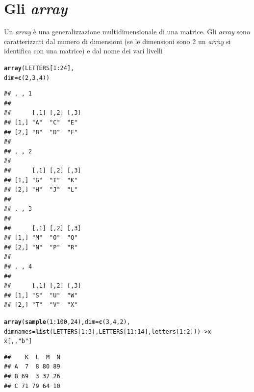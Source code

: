 \documentclass[onecolumn,12pt]{book}\usepackage[]{graphicx}\usepackage[]{color}
\makeatletter
\newcommand{\hlnum}[1]{\textcolor[rgb]{0.686,0.059,0.569}{#1}}%
\newcommand{\hlstr}[1]{\textcolor[rgb]{0.192,0.494,0.8}{#1}}%
\newcommand{\hlopt}[1]{\textcolor[rgb]{0,0,0}{#1}}%
\newcommand{\hlstd}[1]{\textcolor[rgb]{0.345,0.345,0.345}{#1}}%
\newcommand{\hlkwb}[1]{\textcolor[rgb]{0.69,0.353,0.396}{#1}}%
\newcommand{\hlkwc}[1]{\textcolor[rgb]{0.333,0.667,0.333}{#1}}%
\newcommand{\hlkwd}[1]{\textcolor[rgb]{0.737,0.353,0.396}{\textbf{#1}}}%
\newenvironment{kframe}{%
 \def\at@end@of@kframe{}%
 \ifinner\ifhmode%
  \def\at@end@of@kframe{\end{minipage}}%
  \begin{minipage}{\columnwidth}%
 \fi\fi%
 \def\FrameCommand##1{\hskip\@totalleftmargin \hskip-\fboxsep
 \colorbox{shadecolor}{##1}\hskip-\fboxsep
     \hskip-\linewidth \hskip-\@totalleftmargin \hskip\columnwidth}%
 \MakeFramed {\advance\hsize-\width
   \@totalleftmargin\z@ \linewidth\hsize
   \@setminipage}}%
 {\par\unskip\endMakeFramed%
 \at@end@of@kframe}
\newenvironment{knitrout}{}{} %
\makeatother
\begin{document}
\section{Gli \emph{array}}
Un \emph{array}  \`e una generalizzazione multidimensionale di una matrice. Gli \emph{array} sono caratterizzati dal numero di dimensioni  (se le dimensioni sono 2 un \emph{array} si identifica con una  matrice) e dal nome dei vari livelli
\begin{knitrout}
\color{fgcolor}\begin{kframe}
\begin{alltt}
\hlkwd{array}\hlstd{(LETTERS[}\hlnum{1}\hlopt{:}\hlnum{24}\hlstd{],}
\hlkwc{dim}\hlstd{=}\hlkwd{c}\hlstd{(}\hlnum{2}\hlstd{,}\hlnum{3}\hlstd{,}\hlnum{4}\hlstd{))}
\end{alltt}
\begin{verbatim}
## , , 1
## 
##      [,1] [,2] [,3]
## [1,] "A"  "C"  "E" 
## [2,] "B"  "D"  "F" 
## 
## , , 2
## 
##      [,1] [,2] [,3]
## [1,] "G"  "I"  "K" 
## [2,] "H"  "J"  "L" 
## 
## , , 3
## 
##      [,1] [,2] [,3]
## [1,] "M"  "O"  "Q" 
## [2,] "N"  "P"  "R" 
## 
## , , 4
## 
##      [,1] [,2] [,3]
## [1,] "S"  "U"  "W" 
## [2,] "T"  "V"  "X"
\end{verbatim}
\begin{alltt}
\hlkwd{array}\hlstd{(}\hlkwd{sample}\hlstd{(}\hlnum{1}\hlopt{:}\hlnum{100}\hlstd{,}\hlnum{24}\hlstd{),} \hlkwc{dim}\hlstd{=}\hlkwd{c}\hlstd{(}\hlnum{3}\hlstd{,}\hlnum{4}\hlstd{,}\hlnum{2}\hlstd{),}
      \hlkwc{dimnames}\hlstd{=}\hlkwd{list}\hlstd{(LETTERS[}\hlnum{1}\hlopt{:}\hlnum{3}\hlstd{],LETTERS[}\hlnum{11}\hlopt{:}\hlnum{14}\hlstd{],letters[}\hlnum{1}\hlopt{:}\hlnum{2}\hlstd{]))}\hlkwb{->}\hlstd{x}
\hlstd{x[,,}\hlstr{"b"}\hlstd{]}
\end{alltt}
\begin{verbatim}
##    K  L  M  N
## A  7  8 80 89
## B 69  3 37 26
## C 71 79 64 10
\end{verbatim}
\end{kframe}
\end{knitrout}
\end{document}
